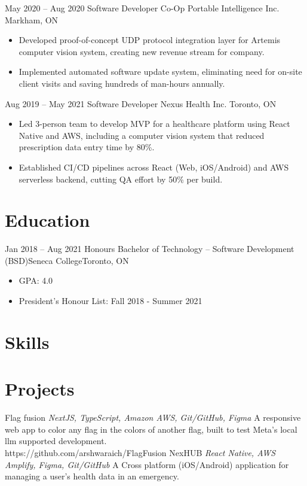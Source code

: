\documentclass[letterpaper]{moderncv}
\begin{document}
\cventry
{May 2020 -- Aug 2020}
{Software Developer Co-Op}
{Portable Intelligence Inc.}
{Markham, ON}
{}
{\begin{itemize}%
	\item Developed proof-of-concept UDP protocol integration layer for Artemis computer vision system, creating new revenue stream for company.
	\item Implemented automated software update system, eliminating need for on-site client visits and saving hundreds of man-hours annually.
	\end{itemize}}
\cventry
{Aug 2019 -- May 2021}
{Software Developer}
{Nexus Health Inc.}
{Toronto, ON}
{}
{\begin{itemize}%
	\item Led 3-person team to develop MVP for a healthcare platform using React Native and AWS, including a computer vision system that reduced prescription data entry time by 80\%.
    \item Established CI/CD pipelines across React (Web, iOS/Android) and AWS serverless backend, cutting QA effort by 50\% per build.
	\end{itemize}}

\section{Education}
\cventry
{Jan 2018 -- Aug 2021}
{Honours Bachelor of Technology – Software Development (BSD)}{Seneca College}{Toronto, ON}{}
{\begin{itemize}%
	\item GPA: 4.0
	\item President's Honour List: Fall 2018 - Summer 2021
	\end{itemize}}

\section{Skills}
\section{Projects}
\cventry
{}
{Flag fusion}
{}
{\textit{NextJS, TypeScript, Amazon AWS, Git/GitHub, Figma}}
{}
{A responsive web app to color any flag in the colors of another flag, built to test Meta's local llm supported development.\\https://github.com/arshwaraich/FlagFusion}
\vspace{1mm}
\cventry
{}
{NexHUB}
{}
{\textit{React Native, AWS Amplify, Figma, Git/GitHub}}
{}
{A Cross platform (iOS/Android) application for managing a user's health data in an emergency.}
\vspace{1mm}
\end{document}
